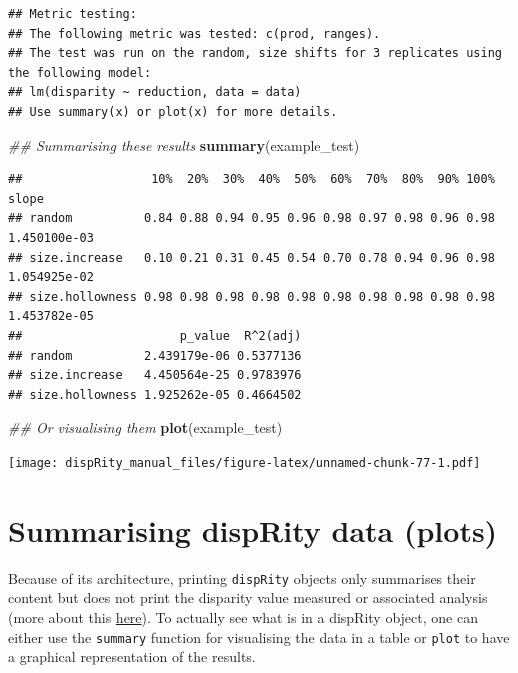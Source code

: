 \documentclass[
]{book}
\newenvironment{Shaded}{\begin{snugshade}}{\end{snugshade}}
\newcommand{\CommentTok}[1]{\textcolor[rgb]{0.56,0.35,0.01}{\textit{#1}}}
\newcommand{\KeywordTok}[1]{\textcolor[rgb]{0.13,0.29,0.53}{\textbf{#1}}}
\newcommand{\NormalTok}[1]{#1}
\begin{document}
\begin{verbatim}
## Metric testing:
## The following metric was tested: c(prod, ranges).
## The test was run on the random, size shifts for 3 replicates using the following model:
## lm(disparity ~ reduction, data = data)
## Use summary(x) or plot(x) for more details.
\end{verbatim}

\begin{Shaded}
\begin{Highlighting}[]
\CommentTok{\#\# Summarising these results}
\KeywordTok{summary}\NormalTok{(example\_test)}
\end{Highlighting}
\end{Shaded}

\begin{verbatim}
##                  10%  20%  30%  40%  50%  60%  70%  80%  90% 100%        slope
## random          0.84 0.88 0.94 0.95 0.96 0.98 0.97 0.98 0.96 0.98 1.450100e-03
## size.increase   0.10 0.21 0.31 0.45 0.54 0.70 0.78 0.94 0.96 0.98 1.054925e-02
## size.hollowness 0.98 0.98 0.98 0.98 0.98 0.98 0.98 0.98 0.98 0.98 1.453782e-05
##                      p_value  R^2(adj)
## random          2.439179e-06 0.5377136
## size.increase   4.450564e-25 0.9783976
## size.hollowness 1.925262e-05 0.4664502
\end{verbatim}

\begin{Shaded}
\begin{Highlighting}[]
\CommentTok{\#\# Or visualising them}
\KeywordTok{plot}\NormalTok{(example\_test)}
\end{Highlighting}
\end{Shaded}

\texttt{[image: dispRity\_manual\_files/figure-latex/unnamed-chunk-77-1.pdf]}

\hypertarget{summarising-disprity-data-plots}{%
\section{Summarising dispRity data (plots)}\label{summarising-disprity-data-plots}}

Because of its architecture, printing \texttt{dispRity} objects only summarises their content but does not print the disparity value measured or associated analysis (more about this \protect\hyperlink{manipulating-dispRity-objects}{here}).
To actually see what is in a dispRity object, one can either use the \texttt{summary} function for visualising the data in a table or \texttt{plot} to have a graphical representation of the results.
\end{document}
